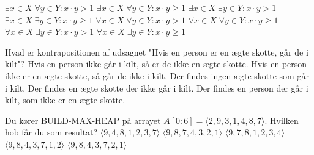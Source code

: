 \mulighederstart
\svar \(\exists x \in X \; \forall y \in Y : x \cdot y > 1\)
\svar \(\exists x \in X \; \forall y \in Y : x \cdot y \geq 1\)
\svar \(\exists x \in X \; \exists y \in Y : x \cdot y > 1\)
\svar \(\exists x \in X \; \exists y \in Y : x \cdot y \geq 1\)
\svar \(\forall x \in X \; \forall y \in Y : x \cdot y > 1\)
\svar \(\forall x \in X \; \forall y \in Y : x \cdot y \geq 1\)
\svar \(\forall x \in X \; \exists y \in Y : x \cdot y > 1\) \korrekt
{}
\svar \(\forall x \in X \; \exists y \in Y : x \cdot y \geq 1\)
\mulighederslut
{}

Hvad er kontrapositionen af udsagnet
"Hvis en person er en ægte skotte, går de i kilt"?
\etsvar
\mulighederstart
\svar Hvis en person ikke går i kilt, så er de ikke en ægte skotte. \korrekt
\svar Hvis en person ikke er en ægte skotte, så går de ikke i kilt. 
\svar Der findes ingen ægte skotte som går i kilt.
\svar Der findes en ægte skotte der ikke går i kilt.
\svar Der findes en person der går i kilt, som ikke er en ægte skotte.
\mulighederslut
{}

Du kører BUILD-MAX-HEAP på arrayet \(A[0: 6] = \langle 2, 9, 3, 1, 4, 8, 7 \rangle\).
Hvilken hob får du som resultat?
\etsvar
\mulighederstart
\svar \(\langle 9, 4, 8, 1, 2, 3, 7 \rangle\) \korrekt
\svar \(\langle 9, 8, 7, 4, 3, 2, 1 \rangle\)
\svar \(\langle 9, 7, 8, 1, 2, 3, 4 \rangle\)
\svar \(\langle 9, 8, 4, 3, 7, 1, 2 \rangle\)
\svar \(\langle 9, 8, 4, 3, 7, 2, 1 \rangle\)
\mulighederslut
{}


